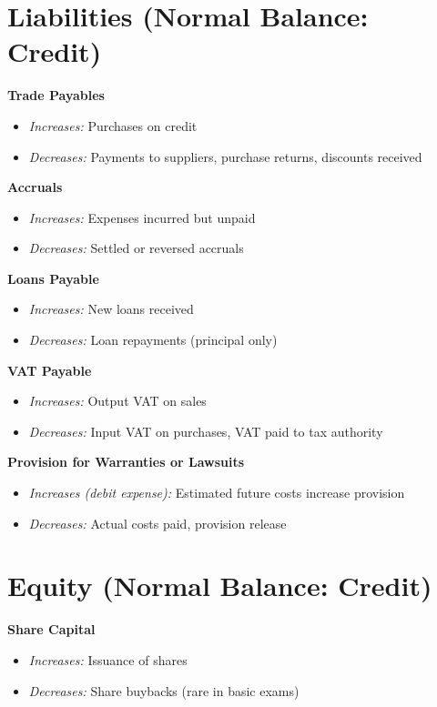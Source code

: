 \section*{Liabilities (Normal Balance: Credit)}

\textbf{Trade Payables}
\begin{itemize}
    \item \textit{Increases:} Purchases on credit
    \item \textit{Decreases:} Payments to suppliers, purchase returns, discounts received
\end{itemize}

\textbf{Accruals}
\begin{itemize}
    \item \textit{Increases:} Expenses incurred but unpaid
    \item \textit{Decreases:} Settled or reversed accruals
\end{itemize}

\textbf{Loans Payable}
\begin{itemize}
    \item \textit{Increases:} New loans received
    \item \textit{Decreases:} Loan repayments (principal only)
\end{itemize}

\textbf{VAT Payable}
\begin{itemize}
    \item \textit{Increases:} Output VAT on sales
    \item \textit{Decreases:} Input VAT on purchases, VAT paid to tax authority
\end{itemize}

\textbf{Provision for Warranties or Lawsuits}
\begin{itemize}
    \item \textit{Increases (debit expense):} Estimated future costs increase provision
    \item \textit{Decreases:} Actual costs paid, provision release
\end{itemize}

\section*{Equity (Normal Balance: Credit)}

\textbf{Share Capital}
\begin{itemize}
    \item \textit{Increases:} Issuance of shares
    \item \textit{Decreases:} Share buybacks (rare in basic exams)
\end{itemize}

